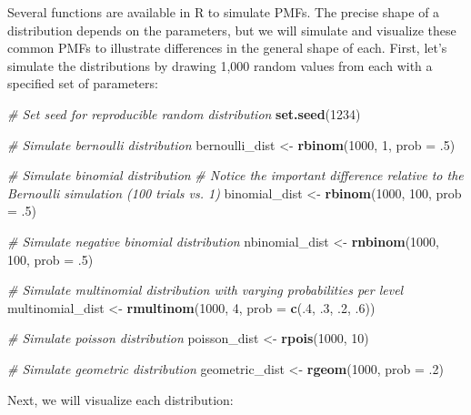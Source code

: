 \documentclass[]{book}
\newenvironment{Shaded}{\begin{snugshade}}{\end{snugshade}}
\newcommand{\CommentTok}[1]{\textcolor[rgb]{0.56,0.35,0.01}{\textit{#1}}}
\newcommand{\DataTypeTok}[1]{\textcolor[rgb]{0.13,0.29,0.53}{#1}}
\newcommand{\DecValTok}[1]{\textcolor[rgb]{0.00,0.00,0.81}{#1}}
\newcommand{\FloatTok}[1]{\textcolor[rgb]{0.00,0.00,0.81}{#1}}
\newcommand{\KeywordTok}[1]{\textcolor[rgb]{0.13,0.29,0.53}{\textbf{#1}}}
\newcommand{\NormalTok}[1]{#1}
\newcommand{\StringTok}[1]{\textcolor[rgb]{0.31,0.60,0.02}{#1}}
\begin{document}
Several functions are available in R to simulate PMFs. The precise shape of a distribution depends on the parameters, but we will simulate and visualize these common PMFs to illustrate differences in the general shape of each. First, let's simulate the distributions by drawing 1,000 random values from each with a specified set of parameters:

\begin{Shaded}
\begin{Highlighting}[]
\CommentTok{# Set seed for reproducible random distribution}
\KeywordTok{set.seed}\NormalTok{(}\DecValTok{1234}\NormalTok{)}

\CommentTok{# Simulate bernoulli distribution}
\NormalTok{bernoulli_dist <-}\StringTok{ }\KeywordTok{rbinom}\NormalTok{(}\DecValTok{1000}\NormalTok{, }\DecValTok{1}\NormalTok{, }\DataTypeTok{prob =} \FloatTok{.5}\NormalTok{)}

\CommentTok{# Simulate binomial distribution}
\CommentTok{# Notice the important difference relative to the Bernoulli simulation (100 trials vs. 1)}
\NormalTok{binomial_dist <-}\StringTok{ }\KeywordTok{rbinom}\NormalTok{(}\DecValTok{1000}\NormalTok{, }\DecValTok{100}\NormalTok{, }\DataTypeTok{prob =} \FloatTok{.5}\NormalTok{) }

\CommentTok{# Simulate negative binomial distribution}
\NormalTok{nbinomial_dist <-}\StringTok{ }\KeywordTok{rnbinom}\NormalTok{(}\DecValTok{1000}\NormalTok{, }\DecValTok{100}\NormalTok{, }\DataTypeTok{prob =} \FloatTok{.5}\NormalTok{) }

\CommentTok{# Simulate multinomial distribution with varying probabilities per level}
\NormalTok{multinomial_dist <-}\StringTok{ }\KeywordTok{rmultinom}\NormalTok{(}\DecValTok{1000}\NormalTok{, }\DecValTok{4}\NormalTok{, }\DataTypeTok{prob =} \KeywordTok{c}\NormalTok{(.}\DecValTok{4}\NormalTok{, }\FloatTok{.3}\NormalTok{, }\FloatTok{.2}\NormalTok{, }\FloatTok{.6}\NormalTok{))}

\CommentTok{# Simulate poisson distribution}
\NormalTok{poisson_dist <-}\StringTok{ }\KeywordTok{rpois}\NormalTok{(}\DecValTok{1000}\NormalTok{, }\DecValTok{10}\NormalTok{) }

\CommentTok{# Simulate geometric distribution}
\NormalTok{geometric_dist <-}\StringTok{ }\KeywordTok{rgeom}\NormalTok{(}\DecValTok{1000}\NormalTok{, }\DataTypeTok{prob =} \FloatTok{.2}\NormalTok{) }
\end{Highlighting}
\end{Shaded}

Next, we will visualize each distribution:
\end{document}
